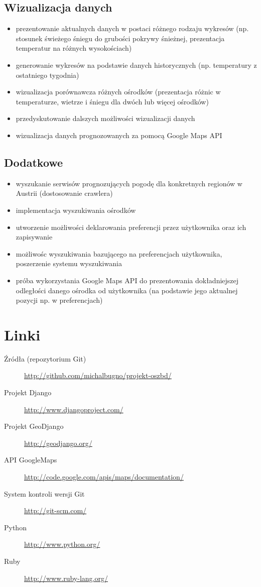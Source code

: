\documentclass[12pt]{article}
\begin{document}
\subsection{Wizualizacja danych}
\begin{itemize}
  \item prezentowanie aktualnych danych w postaci różnego rodzaju wykresów (np. stosunek świeżego śniegu
        do grubości pokrywy śnieżnej, prezentacja temperatur na różnych wysokościach)
  \item generowanie wykresów na podstawie danych historycznych (np. temperatury z ostatniego tygodnia)
  \item wizualizacja porównawcza różnych ośrodków (prezentacja różnic w temperaturze, wietrze i śniegu dla
        dwóch lub więcej ośrodków)
  \item przedyskutowanie dalszych możliwości wizualizacji danych
  \item wizualizacja danych prognozowanych za pomocą Google Maps API
\end{itemize}

\subsection{Dodatkowe}
\begin{itemize}
  \item wyszukanie serwisów prognozujących pogodę dla konkretnych regionów w Austrii (dostosowanie crawlera)
  \item implementacja wyszukiwania ośrodków
  \item utworzenie możliwości deklarowania preferencji przez użytkownika oraz ich zapisywanie
  \item możliwośc wyszukiwania bazującego na preferencjach użytkownika, poszerzenie systemu wyszukiwania
  \item próba wykorzystania Google Maps API do prezentowania dokładniejszej odległości danego ośrodka od
        użytkownika (na podstawie jego aktualnej pozycji np. w preferencjach)
\end{itemize}

\section{Linki}
\begin{description}
  \item[Źródła (repozytorium Git)] \url{http://github.com/michalbugno/projekt-oszbd/}
  \item[Projekt Django] \url{http://www.djangoproject.com/}
  \item[Projekt GeoDjango] \url{http://geodjango.org/}
  \item[API GoogleMaps] \url{http://code.google.com/apis/maps/documentation/}
  \item[System kontroli wersji Git] \url{http://git-scm.com/}
  \item[Python] \url{http://www.python.org/}
  \item[Ruby] \url{http://www.ruby-lang.org/}
\end{description}
\end{document}
